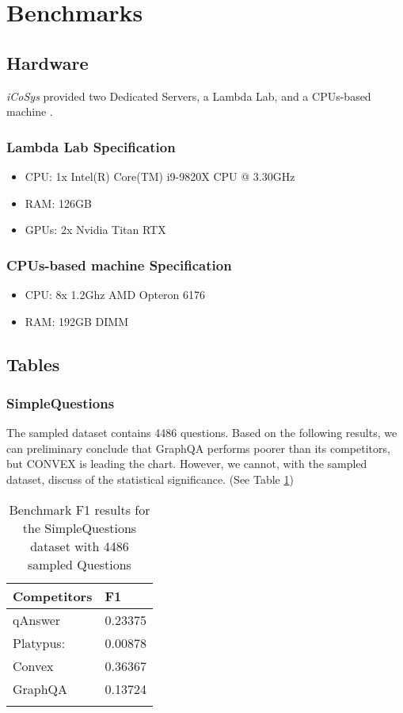 \section{Benchmarks}

\subsection{Hardware}
\textit{iCoSys} provided two Dedicated Servers, a Lambda Lab, and a CPUs-based machine .

\subsubsection{Lambda Lab Specification}
\begin{itemize}
    \setlength\itemsep{0em}
    \item CPU: 1x Intel(R) Core(TM) i9-9820X CPU @ 3.30GHz
    \item RAM: 126GB
    \item GPUs: 2x Nvidia Titan RTX
\end{itemize}

\subsubsection{CPUs-based machine Specification}
\begin{itemize}
    \setlength\itemsep{0em}
    \item CPU: 8x 1.2Ghz AMD Opteron 6176
    \item RAM: 192GB DIMM
\end{itemize}


\subsection{Tables}

\subsubsection{SimpleQuestions}
The sampled dataset contains 4486 questions. Based on the following results, we can preliminary conclude that GraphQA performs poorer than its competitors, but CONVEX is leading the chart. However, we cannot, with the sampled dataset, discuss of the statistical significance. (See Table \ref{tab:results-benchmark-simple})

\begin{longtable}[c]{@{}ll@{}}
\toprule
Competitors & F1      \\* \midrule
\endhead
%
\bottomrule
\endfoot
%
\endlastfoot
%
qAnswer     & 0.23375 \\
Platypus:   & 0.00878 \\
Convex      & 0.36367 \\
GraphQA     & 0.13724 \\* \bottomrule
\caption{Benchmark F1 results for the SimpleQuestions dataset  with 4486 sampled Questions}
\label{tab:results-benchmark-simple}\\
\end{longtable}


